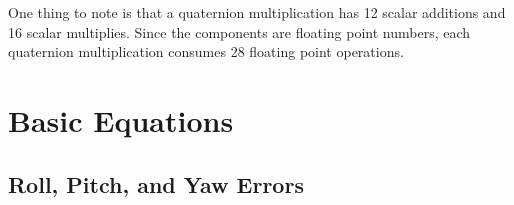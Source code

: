 \documentclass{article}
\numberwithin{equation}{section} %
\begin{document}
One thing to note is that a quaternion multiplication has 12 scalar additions and 16 scalar multiplies. Since the components are floating point numbers, each quaternion multiplication consumes 28 floating point operations. \\

\section{Basic Equations}
  
\subsection{Roll, Pitch, and Yaw Errors} \label{subsec:rollpitchyawerrors}
\end{document}
